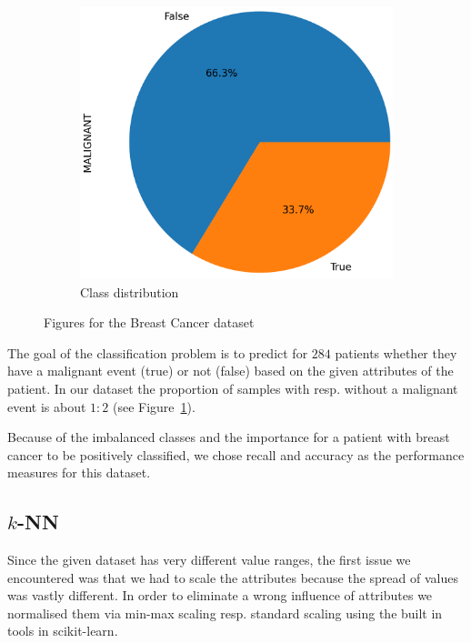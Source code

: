 \documentclass[a4paper,11pt]{article}
\begin{document}
\begin{figure}[h!]
\begin{subfigure}[c]{0.45\textwidth}
            \includegraphics[width=1\textwidth]{figures/breast_cancer_malignant_pie.png}
            \caption{Class distribution}
            \label{fig:breast-cancer_classes_pie}
        \end{subfigure}
        \caption{Figures for the Breast Cancer dataset}
        \label{fig:breast-cancer}
    \end{figure}
    
    The goal of the classification problem is to predict for $284$ patients whether they have a malignant event (true) or not (false) based on the given attributes of the patient. In our dataset the proportion of samples with resp. without a malignant event is about $1:2$ (see Figure~\ref{fig:breast-cancer_classes_pie}).
    
Because of the imbalanced classes and the importance for a patient with breast cancer to be positively classified, we chose recall and accuracy as the performance measures for this dataset. 
    
    \subsection{$k$-NN}
        Since the given dataset has very different value ranges, the first issue we encountered was that we had to scale the attributes because the spread of values was vastly different. In order to eliminate a wrong influence of attributes we normalised them via min-max scaling resp. standard scaling using the built in tools in scikit-learn. 
        
\end{document}
